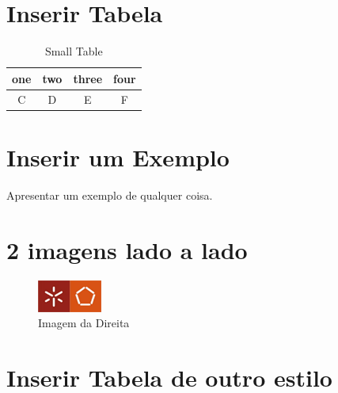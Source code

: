 \pagebreak

\section{Inserir Tabela}

\begin{table}[ht]
\caption{Small Table}
\centering
\begin{tabular}{cccc}
\hline
one&two&three&four\\
\hline
C&D&E&F\\
\hline
\end{tabular}
\end{table}


\section{Inserir um Exemplo}
\vskip6pt
\begin{example}
Apresentar um exemplo de qualquer coisa.
\end{example}


\section{2 imagens lado a lado}

\begin{figure}[H]
{
\includegraphics[width=.5\textwidth]{images/dium}
\caption{Imagem da Direita}
}
\end{figure}


\section{Inserir Tabela de outro estilo}

